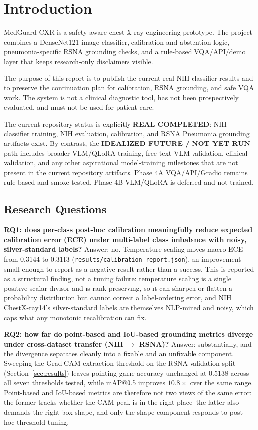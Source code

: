 \section{Introduction}

MedGuard-CXR is a safety-aware chest X-ray engineering prototype. The project combines a DenseNet121 image classifier, calibration and abstention logic, pneumonia-specific RSNA grounding checks, and a rule-based VQA/API/demo layer that keeps research-only disclaimers visible.

The purpose of this report is to publish the current real NIH classifier results and to preserve the continuation plan for calibration, RSNA grounding, and safe VQA work. The system is not a clinical diagnostic tool, has not been prospectively evaluated, and must not be used for patient care.

The current repository status is explicitly \textbf{REAL COMPLETED}: NIH classifier training, NIH evaluation, calibration, and RSNA Pneumonia grounding artifacts exist. By contrast, the \textbf{IDEALIZED FUTURE / NOT YET RUN} path includes broader VLM/QLoRA training, free-text VLM validation, clinical validation, and any other aspirational model-training milestones that are not present in the current repository artifacts. Phase 4A VQA/API/Gradio remains rule-based and smoke-tested. Phase 4B VLM/QLoRA is deferred and not trained.

\subsection{Research Questions}

\textbf{RQ1: does per-class post-hoc calibration meaningfully reduce expected calibration error (ECE) under multi-label class imbalance with noisy, silver-standard labels?} Answer: no. Temperature scaling moves macro ECE from 0.3144 to 0.3113 (\texttt{results/calibration\_report.json}), an improvement small enough to report as a negative result rather than a success. This is reported as a structural finding, not a tuning failure: temperature scaling is a single positive scalar divisor and is rank-preserving, so it can sharpen or flatten a probability distribution but cannot correct a label-ordering error, and NIH ChestX-ray14's silver-standard labels are themselves NLP-mined and noisy, which caps what any monotonic recalibration can fix.

\textbf{RQ2: how far do point-based and IoU-based grounding metrics diverge under cross-dataset transfer (NIH $\rightarrow$ RSNA)?} Answer: substantially, and the divergence separates cleanly into a fixable and an unfixable component. Sweeping the Grad-CAM extraction threshold on the RSNA validation split (Section~\ref{sec:results}) leaves pointing-game accuracy unchanged at 0.5138 across all seven thresholds tested, while mAP@0.5 improves $10.8\times$ over the same range. Point-based and IoU-based metrics are therefore not two views of the same error: the former tracks whether the CAM peak is in the right place, the latter also demands the right box shape, and only the shape component responds to post-hoc threshold tuning.

